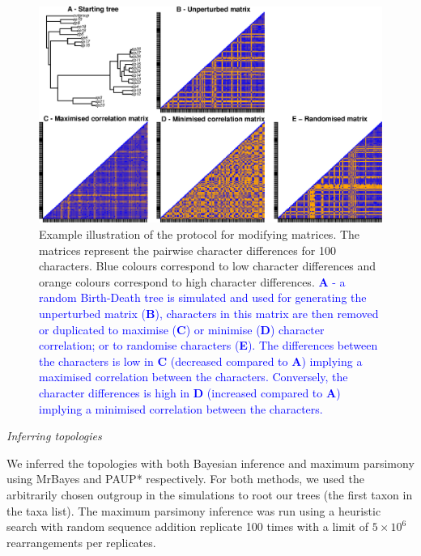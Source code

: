 \documentclass[12pt,letterpaper]{article}
\renewcommand{\subsection}[1]{%
\bigskip
\begin{center}
\begin{large}
\normalfont\itshape #1
\end{large}
\end{center}}
\begin{document}
\begin{figure}[!htbp]
\centering
   \includegraphics[width=1\textwidth]{Modif_matrix.eps}
\caption{Example illustration of the protocol for modifying matrices. The matrices represent the pairwise character differences for 100 characters. Blue colours correspond to low character differences and orange colours correspond to high character differences. \textcolor{blue}{\textbf{A} - a random Birth-Death tree is simulated and used for generating the unperturbed matrix (\textbf{B}), characters in this matrix are then removed or duplicated to maximise (\textbf{C}) or minimise (\textbf{D}) character correlation; or to randomise characters (\textbf{E}). The differences between the characters is low in \textbf{C} (decreased compared to \textbf{A}) implying a maximised correlation between the characters. Conversely, the character differences is high in \textbf{D} (increased compared to \textbf{A}) implying a minimised correlation between the characters.}}
\label{Fig:modif_matrix}
\end{figure}

\subsection{Inferring topologies}
We inferred the topologies with both Bayesian inference and maximum parsimony using MrBayes \citep[v3.2.6;][]{Ronquist2012mrbayes} and PAUP* \citep[v4.0a151;][]{swofford2001paup} respectively.
For both methods, we used the arbitrarily chosen outgroup in the simulations to root our trees (the first taxon in the taxa list).
The maximum parsimony inference was run using a heuristic search with random sequence addition replicate 100 times with a limit of $5\times10^6$ rearrangements per replicates.
\end{document}
